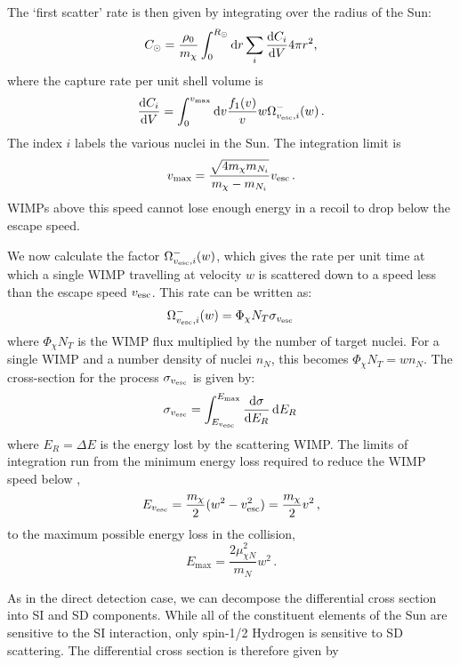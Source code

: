 The `first scatter' rate is then given by integrating over the radius of the Sun:
\begin{equation}
C_{\odot} = \frac{\rho_0}{m_\chi} \int_{0}^{R_{\odot}} \textrm{d}r \sum_i \frac{\mathrm{d}C_i}{\mathrm{d}V} 4 \pi r^{2},
\end{equation}
where the capture rate per unit shell volume is
\begin{equation}
\label{eq:NT:dCdV}
\dbd{C_i}{V} = \int_{0}^{v_{\textrm{max}}} \textrm{d}v \frac{f_1(v)}{v} w \ScatRate\,.
\end{equation}
The index \(i\) labels the various nuclei in the Sun. The integration limit is
\begin{equation}
v_{\textrm{max}} = \frac{\sqrt{4m_\chi m_{N_i}}}{m_\chi - m_{N_i}}\vesc\,.
\end{equation}
WIMPs above this speed cannot lose enough energy in a recoil to drop below the escape speed.

We now calculate the factor $\ScatRate$, which gives the rate per unit time at which a single WIMP travelling at velocity \(w\) is scattered down to a speed less than the escape speed \(\vesc\). This rate can be written as:
\begin{equation}
\ScatRate = \Phi_\chi N_T \sigma_{\vesc}\,
\end{equation}
where \(\Phi_\chi N_T\) is the WIMP flux multiplied by the number of target nuclei. For a single WIMP and a number density of nuclei \(n_N\), this becomes \( \Phi_\chi N_T = w n_N\). The cross-section for the process \(\sigma_{\vesc}\) is given by:
\begin{equation}
\label{eq:NT:sigma}
\sigma_{\vesc}  = \int_{E_{\vesc}}^{E_\textrm{max}} \dbd{\sigma}{E_R} \, \textrm{d}E_R\,
\end{equation}
where \(E_R = \Delta E\) is the energy lost by the scattering WIMP. The limits of integration run from the minimum energy loss required to reduce the WIMP speed below \vesc,
\begin{equation}
E_{\vesc} = \frac{m_\chi}{2}(w^2 - \vesc^2) = \frac{m_\chi}{2}v^2\,,
\end{equation}
to the maximum possible energy loss in the collision,
\begin{equation}
E_\textrm{max} = \frac{2 \mu_{\chi N}^2}{m_N} w^2\,.
\end{equation}

As in the direct detection case, we can decompose the differential cross section into SI and SD components. While all of the constituent elements of the Sun are sensitive to the SI interaction, only spin-1/2 Hydrogen is sensitive to SD scattering. The differential cross section is therefore given by

